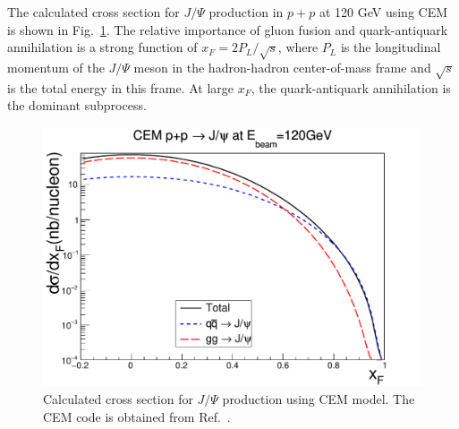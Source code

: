The calculated cross section for $J/\Psi$ production in $p+p$ at 120 GeV using 
CEM is shown in Fig.\ \ref{fig:cem_cs}. The relative importance of gluon fusion 
and quark-antiquark annihilation is a strong function of $x_F=2P_L/\sqrt{s}$, 
where $P_L$ is the longitudinal momentum of the $J/\Psi$ meson in the 
hadron-hadron center-of-mass frame and $\sqrt{s}$ is the total energy in this 
frame. At large $x_F$, the quark-antiquark annihilation is the dominant subprocess.  
\begin{figure}[h!]
    \centering
    \includegraphics[width=0.45\linewidth]{images/pp_norm_cs_NLO_pp}
    \caption{Calculated cross section for $J/\Psi$ production using CEM model. 
		The CEM code is obtained from Ref.\ \cite{mangano1993}.}
    \label{fig:cem_cs}
\end{figure}

